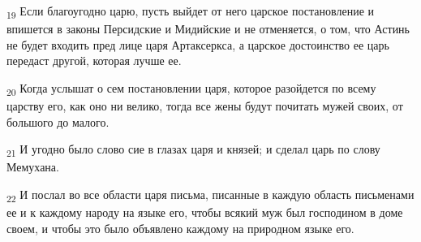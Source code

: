 \begin{tcolorbox}
\textsubscript{19} Если благоугодно царю, пусть выйдет от него царское постановление и впишется в законы Персидские и Мидийские и не отменяется, о том, что Астинь не будет входить пред лице царя Артаксеркса, а царское достоинство ее царь передаст другой, которая лучше ее.
\end{tcolorbox}
\begin{tcolorbox}
\textsubscript{20} Когда услышат о сем постановлении царя, которое разойдется по всему царству его, как оно ни велико, тогда все жены будут почитать мужей своих, от большого до малого.
\end{tcolorbox}
\begin{tcolorbox}
\textsubscript{21} И угодно было слово сие в глазах царя и князей; и сделал царь по слову Мемухана.
\end{tcolorbox}
\begin{tcolorbox}
\textsubscript{22} И послал во все области царя письма, писанные в каждую область письменами ее и к каждому народу на языке его, чтобы всякий муж был господином в доме своем, и чтобы это было объявлено каждому на природном языке его.
\end{tcolorbox}
